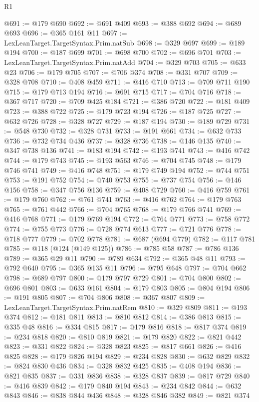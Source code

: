 \begin{lexlean}{R1}
\begin{coremodule}
@691 := @179 @690
@692 := @691 @409
@693 := @388 @692
@694 := @689 @693
@696 := @365 @161 @11
@697 := LexLeanTarget.TargetSyntax.Prim.natSub
@698 := @329 @697
@699 := @189 @194
@700 := @187 @699
@701 := @698 @700
@702 := @696 @701
@703 := LexLeanTarget.TargetSyntax.Prim.natAdd
@704 := @329 @703
@705 := @633 @23
@706 := @179 @705
@707 := @706 @374
@708 := @331 @707
@709 := @328 @708
@710 := @408 @459
@711 := @416 @710
@713 := @709 @711 @190
@715 := @179 @713 @194
@716 := @691 @715
@717 := @704 @716
@718 := @367 @717
@720 := @709 @425 @184
@721 := @386 @720
@722 := @181 @409
@723 := @388 @722
@725 := @179 @723 @194
@726 := @187 @725
@727 := @632 @726
@728 := @328 @727
@729 := @187 @194
@730 := @189 @729
@731 := @548 @730
@732 := @328 @731
@733 := @191 @661
@734 := @632 @733
@736 := @732 @734 @436
@737 := @328 @736
@738 := @146 @135
@740 := @347 @738 @136
@741 := @183 @194
@742 := @193 @741
@743 := @416 @742
@744 := @179 @743
@745 := @193 @563
@746 := @704 @745
@748 := @179 @746 @741
@749 := @416 @748
@751 := @179 @749 @194
@752 := @744 @751
@753 := @191 @752
@754 := @740 @753
@755 := @737 @754
@756 := @146 @156
@758 := @347 @756 @136
@759 := @408 @729
@760 := @416 @759
@761 := @179 @760
@762 := @761 @741
@763 := @416 @762
@764 := @179 @763
@765 := @761 @442
@766 := @704 @765
@768 := @179 @766 @741
@769 := @416 @768
@771 := @179 @769 @194
@772 := @764 @771
@773 := @758 @772
@774 := @755 @773
@776 := @728 @774 @613
@777 := @721 @776
@778 := @718 @777
@779 := @702 @778
@781 := @687 (@694 @779)
@782 := @117 @781
@785 := @118 (@124 (@149 @125))
@786 := @785 @58
@787 := @786 @136
@789 := @365 @29 @11
@790 := @789 @634
@792 := @365 @48 @11
@793 := @792 @640
@795 := @365 @135 @11
@796 := @795 @648
@797 := @704 @662
@798 := @689 @797
@800 := @179 @797 @729
@801 := @704 @800
@802 := @696 @801
@803 := @633 @161
@804 := @179 @803
@805 := @804 @194
@806 := @191 @805
@807 := @704 @806
@808 := @367 @807
@809 := LexLeanTarget.TargetSyntax.Prim.natRem
@810 := @329 @809
@811 := @193 @374
@812 := @181 @811
@813 := @810 @812
@814 := @386 @813
@815 := @335 @48
@816 := @334 @815
@817 := @179 @816
@818 := @817 @374
@819 := @234 @818
@820 := @810 @819
@821 := @179 @820
@822 := @821 @442
@823 := @331 @822
@824 := @328 @823
@825 := @817 @661
@826 := @416 @825
@828 := @179 @826 @194
@829 := @234 @828
@830 := @632 @829
@832 := @824 @830 @436
@834 := @328 @832 @425
@835 := @408 @194
@836 := @821 @835
@837 := @331 @836
@838 := @328 @837
@839 := @817 @729
@840 := @416 @839
@842 := @179 @840 @194
@843 := @234 @842
@844 := @632 @843
@846 := @838 @844 @436
@848 := @328 @846 @382
@849 := @821 @374

\end{coremodule}
\end{lexlean}
